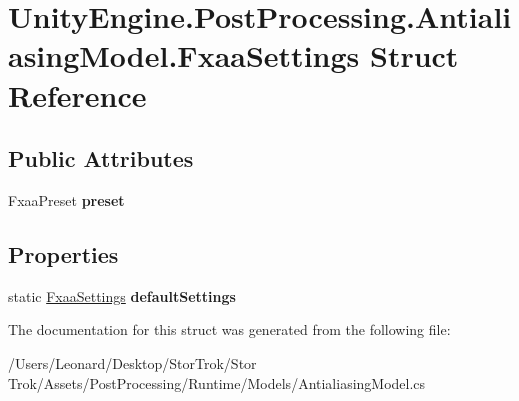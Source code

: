 \hypertarget{struct_unity_engine_1_1_post_processing_1_1_antialiasing_model_1_1_fxaa_settings}{}\section{Unity\+Engine.\+Post\+Processing.\+Antialiasing\+Model.\+Fxaa\+Settings Struct Reference}
\label{struct_unity_engine_1_1_post_processing_1_1_antialiasing_model_1_1_fxaa_settings}
\subsection*{Public Attributes}
\begin{DoxyCompactItemize}
\item 
\mbox{\label{struct_unity_engine_1_1_post_processing_1_1_antialiasing_model_1_1_fxaa_settings_a3891e742e96eb912e7557eb8c0fef920}} 
Fxaa\+Preset {\bfseries preset}
\end{DoxyCompactItemize}
\subsection*{Properties}
\begin{DoxyCompactItemize}
\item 
\mbox{\label{struct_unity_engine_1_1_post_processing_1_1_antialiasing_model_1_1_fxaa_settings_af1057b60af6b18d48a1f9df7a4de9331}} 
static \hyperlink{struct_unity_engine_1_1_post_processing_1_1_antialiasing_model_1_1_fxaa_settings}{Fxaa\+Settings} {\bfseries default\+Settings}
\end{DoxyCompactItemize}


The documentation for this struct was generated from the following file\+:\begin{DoxyCompactItemize}
\item 
/\+Users/\+Leonard/\+Desktop/\+Stor\+Trok/\+Stor Trok/\+Assets/\+Post\+Processing/\+Runtime/\+Models/Antialiasing\+Model.\+cs\end{DoxyCompactItemize}
